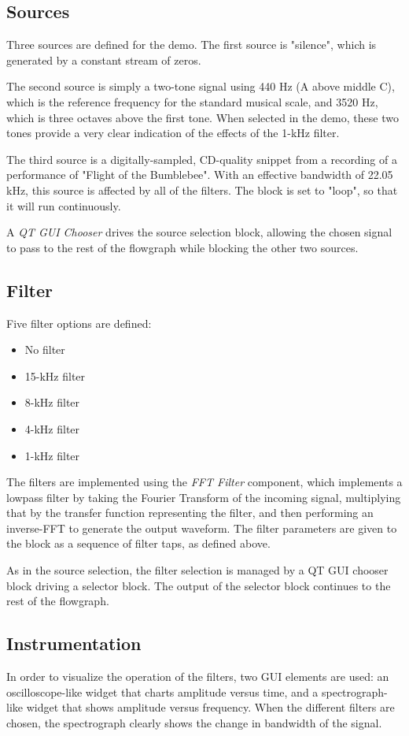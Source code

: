 \subsection{Sources}

Three sources are defined for the demo. The first source is
"silence", which is generated by a constant stream of zeros. 

The second source is simply a two-tone signal using 440 Hz (A
above middle C), which is the reference frequency for the
standard musical scale, and 3520 Hz, which is three octaves above
the first tone. When selected in the demo, these two tones
provide a very clear indication of the effects of the 1-kHz
filter.

The third source is a digitally-sampled, CD-quality
snippet from a recording of a performance of "Flight of the
Bumblebee". With an effective bandwidth of 22.05 kHz, this source
is affected by all of the filters. The block is set to
"loop", so that it will run continuously.

A \textit{QT GUI Chooser} drives the source selection block,
allowing the chosen signal to pass to the rest of the flowgraph
while blocking the other two sources.

\subsection{Filter}
Five filter options are defined: 
\begin{itemize}
	\item No filter
	\item 15-kHz filter
	\item 8-kHz filter
	\item 4-kHz filter
	\item 1-kHz filter
\end{itemize}

The filters are implemented using the \textit{FFT Filter} component, which
implements a lowpass filter by taking the Fourier Transform of the
incoming signal, multiplying that by the transfer function
representing the filter, and then performing an inverse-FFT to
generate the output waveform.  The filter parameters are given to 
the block as a sequence of filter taps, as defined above.

As in the source selection, the filter selection is managed by a
QT GUI chooser block driving a selector block.  The output of the 
selector block continues to the rest of the flowgraph.

\subsection{Instrumentation}
In order to visualize the operation of the filters, two GUI elements
are used: an oscilloscope-like widget that charts amplitude versus time,
and a spectrograph-like widget that shows amplitude versus frequency.
When the different filters are chosen, the spectrograph clearly shows
the change in bandwidth of the signal.

